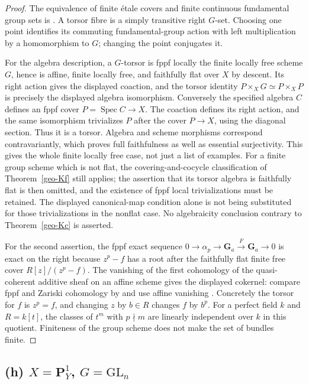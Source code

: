 \begin{proof}
The equivalence of finite \'etale covers and finite continuous fundamental
group sets is \cite[Theorem 58.6.2, tag 0BND]{geoStacksPiOne}.
A torsor fibre is a simply transitive right $G$-set. Choosing one point
identifies its commuting fundamental-group action with left multiplication
by a homomorphism to $G$; changing the point conjugates it.

For the algebra description, a $G$-torsor is fppf locally the finite
locally free scheme $G$, hence is affine, finite locally free, and
faithfully flat over $X$ by descent. Its right action gives the displayed
coaction, and the torsor identity
$P\times_XG\simeq P\times_XP$ is precisely the displayed algebra
isomorphism. Conversely the specified algebra $C$ defines an fppf cover
$P=\operatorname{Spec}C\to X$. The coaction defines its right action,
and the same isomorphism trivializes $P$ after the cover $P\to X$,
using the diagonal section. Thus it is a torsor. Algebra and scheme
morphisms correspond contravariantly, which proves full faithfulness as
well as essential surjectivity. This gives the whole finite locally free
case, not just a list of examples. For a finite group scheme which is
not flat, the covering-and-cocycle classification of
Theorem~\ref{geo-Kf} still applies; the assertion that its torsor algebra
is faithfully flat is then omitted, and the existence of fppf local
trivializations must be retained. The displayed canonical-map condition
alone is not being substituted for those trivializations in the nonflat
case. No algebraicity conclusion
contrary to Theorem~\ref{geo-Kc} is asserted.

For the second assertion, the fppf exact sequence
$0\to\alpha_p\to\mathbf G_a\xrightarrow{F}\mathbf G_a\to0$
is exact on the right because $z^p-f$ has a root after the faithfully flat
finite free cover $R[z]/(z^p-f)$. The vanishing of the first cohomology of
the quasi-coherent additive sheaf on an affine scheme gives the displayed
cokernel: compare fppf and Zariski cohomology by
\cite[Theorem 59.22.4, tag 03P2]{geoStacksQCfppf} and use affine
vanishing \cite[Lemma 30.2.2, tag 01XB]{geoStacksAffineCoh}.
Concretely the torsor for $f$ is $z^p=f$, and changing $z$ by
$b\in R$ changes $f$ by $b^p$. For a perfect field $k$ and $R=k[t]$, the
classes of $t^m$ with $p\nmid m$ are linearly independent over $k$ in this
quotient. Finiteness of the group scheme does not make the set of bundles
finite.
\end{proof}

\subsection{(h) \texorpdfstring{$X=\mathbf P^1_Y$, $G=\mathrm{GL}_n$}{X=P1 over Y, G=GL(n)}}

